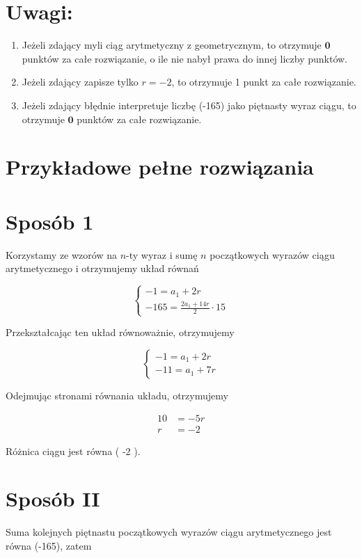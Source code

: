\documentclass[10pt]{article}
\begin{document}
\section*{Uwagi:}
\begin{enumerate}
  \item Jeżeli zdający myli ciąg arytmetyczny z geometrycznym, to otrzymuje $\mathbf{0}$ punktów za całe rozwiązanie, o ile nie nabył prawa do innej liczby punktów.
  \item Jeżeli zdający zapisze tylko $r=-2$, to otrzymuje 1 punkt za całe rozwiązanie.
  \item Jeżeli zdający błędnie interpretuje liczbę (-165) jako piętnasty wyraz ciągu, to otrzymuje $\mathbf{0}$ punktów za całe rozwiązanie.
\end{enumerate}

\section*{Przykładowe pełne rozwiązania}
\section*{Sposób 1}
Korzystamy ze wzorów na $n$-ty wyraz i sumę $n$ początkowych wyrazów ciągu arytmetycznego i otrzymujemy układ równań

$$
\left\{\begin{array}{c}
-1=a_{1}+2 r \\
-165=\frac{2 a_{1}+14 r}{2} \cdot 15
\end{array}\right.
$$

Przekształcając ten układ równoważnie, otrzymujemy

$$
\left\{\begin{array}{c}
-1=a_{1}+2 r \\
-11=a_{1}+7 r
\end{array}\right.
$$

Odejmując stronami równania układu, otrzymujemy

$$
\begin{aligned}
10 & =-5 r \\
r & =-2
\end{aligned}
$$

Różnica ciągu jest równa ( -2 ).

\section*{Sposób II}
Suma kolejnych piętnastu początkowych wyrazów ciągu arytmetycznego jest równa (-165), zatem
\end{document}
